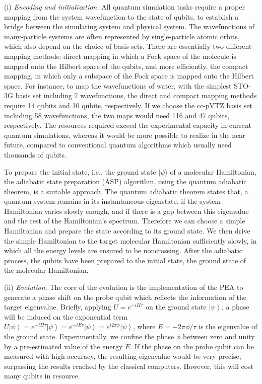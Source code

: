 \documentclass[8.5pt,twoside,twocolumn]{article}
\begin{document}
(i)\emph{ Encoding and initialization.}
All quantum simulation tasks require a proper mapping
from the system wavefunction to the state of qubits,
to establish a bridge between the simulating system
and physical system. The wavefunctions of many-particle systems
are often represented by single-particle atomic orbits,
which also depend on the choice of basis sets.
There are essentially two different mapping methods:
direct mapping in which a Fock space of the molecule
is mapped onto the Hilbert space of the qubits,
and more efficiently, the compact mapping,
in which only a subspace of the Fock space
is mapped onto the Hilbert space.
For instance, to map the wavefunctions of water,
with the simplest STO-3G basis set including 7 wavefunctions,
the direct and compact mapping methods require 14 qubits
and 10 qubits, respectively. If we choose
the cc-pVTZ basis set including 58 wavefunctions,
the two maps would need 116 and 47 qubits, respectively.\cite{Alan_first}
The resources required exceed the experimental
capacity in current quantum simulations,
whereas it would be more possible to realize in the near future,
compared to conventional quantum algorithms
which usually need thousands of qubits.

To prepare the initial state, i.e.,
the ground state $|\psi\rangle$ of a molecular Hamiltonian,
the adiabatic state preparation (ASP) algorithm,
using the quantum adiabatic theorem,\cite{adiabatic}
is a suitable approach. The quantum adiabatic theorem states that,
a quantum system remains in its instantaneous eigenstate,
if the system Hamiltonian varies slowly enough,
and if there is a gap
between this eigenvalue and
the rest of the Hamiltonian's spectrum.\cite{adiabatic}
Therefore we can choose a simple Hamiltonian
and prepare the state according to its ground state.
We then drive the simple Hamiltonian
to the target molecular Hamiltonian sufficiently slowly,
in which all the energy levels are ensured to be noncrossing.
After the adiabatic process, the qubits
have been prepared to the initial state,
the ground state of the molecular Hamiltonian.

(ii)\emph{ Evolution.} The core of the evolution is
the implementation of the PEA to generate a phase shift
on the probe qubit which reflects the information
of the target eigenvalue.
Briefly, applying $U=e^{-iH\tau}$ on the ground state
$\left\vert \psi \right\rangle$, a phase will be induced
on the exponential term $U \left\vert \psi \right\rangle =
e^{-iH\tau}\left\vert \psi \right\rangle =
e^{-iE\tau}\left\vert \psi \right\rangle =
e^{i2 \pi \phi}\left\vert \psi \right\rangle$,
where $E=-2\pi\phi/\tau$ is the eigenvalue of the ground state.
Experimentally, we confine the phase $\phi$ between zero and unity
by a pre-estimated value of the energy $E$.
If the phase on the probe qubit can be
measured with high accuracy, the resulting eigenvalue
would be very precise,
surpassing the results reached by
the classical computers. However, this will cost
many qubits in resource.
\end{document}
